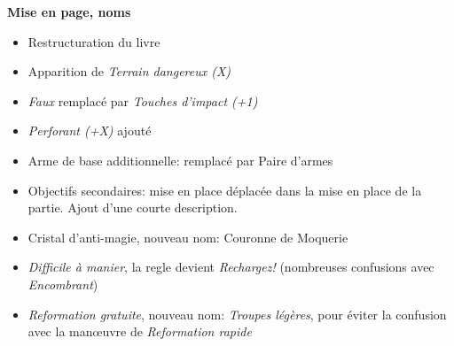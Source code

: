 \noindent \textbf{Mise en page, noms}
\begin{itemize}
\item Restructuration du livre
\item Apparition de \emph{Terrain dangereux (X)}
\item \emph{Faux} remplacé par \emph{Touches d'impact (+1)}
\item \emph{Perforant (+X)} ajouté
\item Arme de base additionnelle: remplacé par Paire d'armes
\item Objectifs secondaires: mise en place déplacée dans la mise en place de la partie. Ajout d'une courte description.
\item Cristal d'anti-magie, nouveau nom: Couronne de Moquerie
\item \emph{Difficile à manier}, la regle devient \emph{Rechargez!} (nombreuses confusions avec \emph{Encombrant})
\item \emph{Reformation gratuite}, nouveau nom: \emph{Troupes légères}, pour éviter la confusion avec la manœuvre de \emph{Reformation rapide}
\end{itemize}

